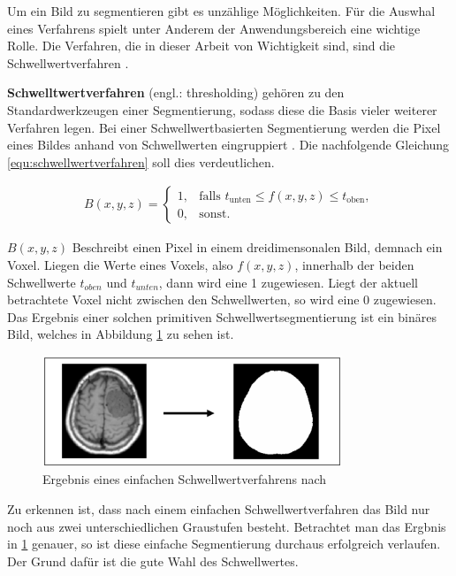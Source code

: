 Um ein Bild zu segmentieren gibt es unzählige Möglichkeiten. Für die Auswhal eines
Verfahrens spielt unter Anderem der Anwendungsbereich eine wichtige Rolle. Die
Verfahren, die in dieser Arbeit von Wichtigkeit sind, sind die
Schwellwertverfahren \citep[vgl.][Seite 361]{lehmann2013bildverarbeitung}.

\pagebreak

\textbf{Schwelltwertverfahren} (engl.: thresholding) gehören zu den
Standardwerkzeugen einer Segmentierung, sodass diese die Basis vieler weiterer Verfahren
legen. Bei einer Schwellwertbasierten Segmentierung werden die Pixel eines
Bildes anhand von Schwellwerten eingruppiert \citep[vgl.][Seite 96]{handels2000}.
Die nachfolgende Gleichung \ref{equ:schwellwertverfahren} soll dies verdeutlichen.

\begin{align}
	\label{equ:schwellwertverfahren}B(x, y, z) = \begin{cases}1,&\text{falls }t_{\text{unten}}\leq f(x, y, z) \leq t_{\text{oben}}, \\ 0,&\text{sonst}.\end{cases}
\end{align}

$B(x, y, z)$ Beschreibt einen Pixel in einem dreidimensonalen Bild, demnach ein Voxel.
Liegen die Werte eines Voxels, also $f(x, y, z)$, innerhalb der beiden
Schwellwerte $t_{oben}$ und $t_{unten}$, dann wird eine 1 zugewiesen. Liegt der
aktuell betrachtete Voxel nicht zwischen den Schwellwerten, so wird eine 0 zugewiesen.
Das Ergebnis einer solchen primitiven Schwellwertsegmentierung ist ein binäres
Bild, welches in Abbildung \ref{fig:binäres_schwellwertverfahren} zu sehen ist.

\begin{figure}[h]
	\centering
	\includegraphics[width=0.8\textwidth]{img/beispiel_schwellwertverfahren.jpg}
	\caption{Ergebnis eines einfachen Schwellwertverfahrens nach \citet[Seite 96]{handels2000}}
	\label{fig:binäres_schwellwertverfahren}
\end{figure}

Zu erkennen ist, dass nach einem einfachen Schwellwertverfahren das Bild nur noch
aus zwei unterschiedlichen Graustufen besteht. Betrachtet man das Ergbnis in
\ref{fig:binäres_schwellwertverfahren} genauer, so ist diese einfache Segmentierung
durchaus erfolgreich verlaufen. Der Grund dafür ist die gute Wahl des
Schwellwertes.

